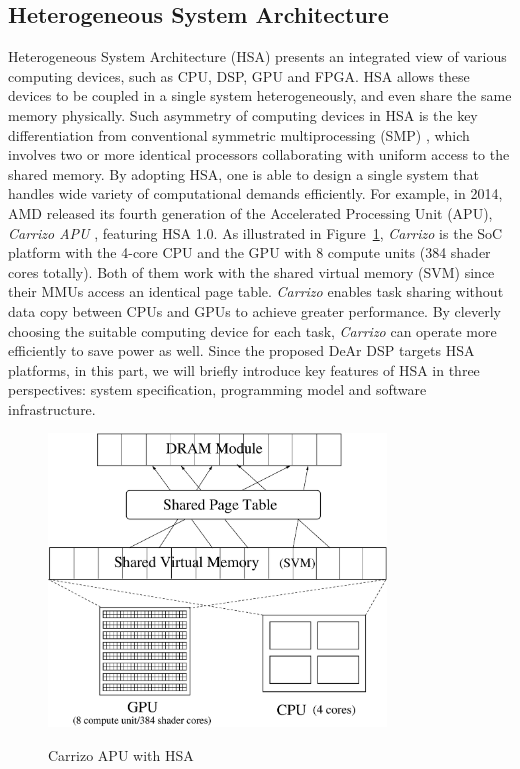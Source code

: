 \documentclass[12pt]{article}
\begin{document}
\begin{CJK}{UTF8}{bkai}
    \subsection{Heterogeneous System Architecture}
    Heterogeneous System Architecture (HSA) presents an integrated view of various computing devices, 
    such as CPU, DSP, GPU and FPGA.
    HSA allows these devices to be coupled in a single system heterogeneously, and even share the same memory physically.
    Such asymmetry of computing devices in HSA is the key differentiation from conventional symmetric multiprocessing (SMP) \cite{parallel},
    which involves two or more identical processors collaborating with uniform access to the shared memory.
    By adopting HSA, one is able to design a single system that handles wide variety of computational demands efficiently.
    For example, in 2014, AMD released its fourth generation of the Accelerated Processing Unit (APU), \textit{Carrizo APU} \cite{carrizo}, featuring HSA 1.0.
    As illustrated in Figure~\ref{fig:carrizo}, \textit{Carrizo} is the SoC platform with the 4-core CPU and the GPU with 8 compute units (384 shader cores totally).
    Both of them work with the shared virtual memory (SVM) since their MMUs access an identical page table.
    \textit{Carrizo} enables task sharing without data copy between CPUs and GPUs to achieve greater performance.
    By cleverly choosing the suitable computing device for each task, 
    \textit{Carrizo} can operate more efficiently to save power as well.
    Since the proposed DeAr DSP targets HSA platforms, 
    in this part, we will briefly introduce key features of HSA in three perspectives: 
    system specification, programming model and software infrastructure.
        \begin{figure}[!ht] 
            \caption{Carrizo APU with HSA}
            \centering
            \includegraphics[width=0.8\textwidth]{./figs/carrizo.eps}
            \label{fig:carrizo}
        \end{figure}

\end{CJK}
\end{document}
